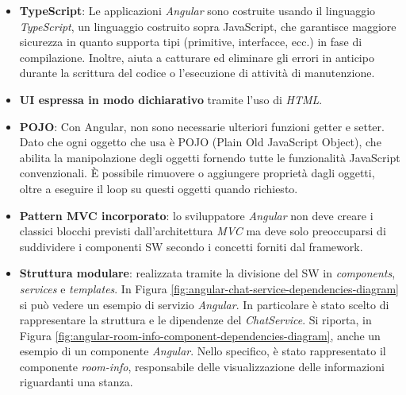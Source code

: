 \begin{itemize}
    \item \textbf{TypeScript}: Le applicazioni \textit{Angular} sono costruite usando il linguaggio \textit{TypeScript}, un linguaggio costruito sopra JavaScript, che garantisce maggiore sicurezza in quanto supporta tipi (primitive, interfacce, ecc.) in fase di compilazione. Inoltre, aiuta a catturare ed eliminare gli errori in anticipo durante la scrittura del codice o l'esecuzione di attività di manutenzione.
    \item \textbf{UI espressa in modo dichiarativo} tramite l'uso di \textit{HTML}.
    \item \textbf{POJO}: Con Angular, non sono necessarie ulteriori funzioni getter e setter. Dato che ogni oggetto che usa è POJO (Plain Old JavaScript Object), che abilita la manipolazione degli oggetti fornendo tutte le funzionalità JavaScript convenzionali. È possibile rimuovere o aggiungere proprietà dagli oggetti, oltre a eseguire il loop su questi oggetti quando richiesto.
    \item \textbf{Pattern MVC incorporato}: lo sviluppatore \textit{Angular} non deve creare i classici blocchi previsti dall'architettura \textit{MVC} ma deve solo preoccuparsi di suddividere i componenti SW secondo i concetti forniti dal framework.
    \item \textbf{Struttura modulare}: realizzata tramite la divisione del SW in \textit{components}, \textit{services} e \textit{templates}. In Figura \ref{fig:angular-chat-service-dependencies-diagram} si può vedere un esempio di servizio \textit{Angular}. In particolare è stato scelto di rappresentare la struttura e le dipendenze del \textit{ChatService}. Si riporta, in Figura \ref{fig:angular-room-info-component-dependencies-diagram}, anche un esempio di un componente \textit{Angular}. Nello specifico, è stato rappresentato il componente \textit{room-info}, responsabile delle visualizzazione delle informazioni riguardanti una stanza.
    \begin{figure}
        \centering

\end{figure}
\end{itemize}
